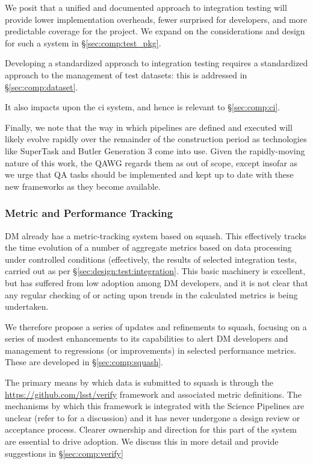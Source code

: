 We posit that a unified and documented approach to integration testing will
provide lower implementation overheads, fewer surprised for developers, and
more predictable coverage for the project. We expand on the considerations and
design for such a system in \S\ref{sec:comp:test_pkg}.

Developing a standardized approach to integration testing requires a
standardized approach to the management of test datasets: this is addressed in
\S\ref{sec:comp:dataset}.

It also impacts upon the \gls{ci} system, and hence is relevant to
\S\ref{sec:comp:ci}.

Finally, we note that the way in which pipelines are defined and executed will
likely evolve rapidly over the remainder of the construction period as
technologies like SuperTask and Butler Generation 3 come into use. Given the
rapidly-moving nature of this work, the QAWG regards them as out of scope,
except insofar as we urge that QA tasks should be implemented and kept up to
date with these new frameworks as they become available.

\subsubsection{Metric and Performance Tracking}

DM already has a metric-tracking system based on \gls{squash}. This
effectively tracks the time evolution of a number of \glspl{aggregate metric}
based on data processing under controlled conditions (effectively, the results
of selected integration tests, carried out as per
\S\ref{sec:design:test:integration}. This basic machinery is excellent, but
has suffered from low adoption among DM developers, and it is not clear that
any regular checking of or acting upon trends in the calculated metrics is
being undertaken.

We therefore propose a series of updates and refinements to \gls{squash},
focusing on a series of modest enhancements to its capabilities to alert DM
developers and management to regressions (or improvements) in selected
performance metrics. These are developed in \S\ref{sec:comp:squash}.

The primary means by which data is submitted to \gls{squash} is through the
\href{lsst.verify}{https://github.com/lsst/verify} framework and associated
metric definitions. The mechanisms by which this framework is integrated with
the Science Pipelines are unclear (refer to  for a
discussion) and it has never undergone a design review or acceptance process.
Clearer ownership and direction for this part of the system are essential to
drive adoption. We discuss this in more detail and provide suggestions in
\S\ref{sec:comp:verify}

